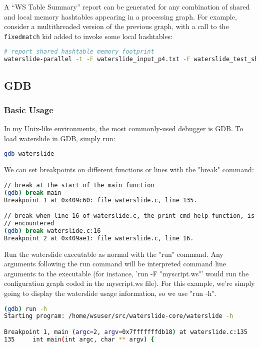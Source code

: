 \documentclass[11pt]{article}
\begin{document}
A ``WS Table Summary'' report can be generated for any combination of shared and local memory
hashtables  appearing in a processing graph. For example, consider a multithreaded version of the
previous graph, with a call to the \texttt{fixedmatch} kid added to invoke some local hashtables:

\begin{lstlisting}[language=bash]
# report shared hashtable memory footprint
waterslide-parallel -t -F waterslide_input_p4.txt -F waterslide_test_shared_p4.txt
\end{lstlisting}

\subsection{GDB}

\subsubsection{Basic Usage}
In my Unix-like environments, the most commonly-used debugger is GDB. To load
waterslide in GDB, simply run: 

\begin{lstlisting}[language=bash]
gdb waterslide
\end{lstlisting}

We can set breakpoints on different functions or lines with the "break"
command: 

\begin{lstlisting}[language=bash]
// break at the start of the main function
(gdb) break main
Breakpoint 1 at 0x409c60: file waterslide.c, line 135.

// break when line 16 of waterslide.c, the print_cmd_help function, is 
// encountered
(gdb) break waterslide.c:16
Breakpoint 2 at 0x409ae1: file waterslide.c, line 16.
\end{lstlisting}

Run the waterslide executable as normal with the "run" command. Any arguments
following the run command will be interpreted command line arguments to the 
executable (for instance, 'run -F "myscript.ws"' would run the configuration graph coded in the
myscript.ws file).  For this example, we're simply going to display the waterslide usage information, so we use "run -h".

\begin{lstlisting}[language=bash]
(gdb) run -h
Starting program: /home/wsuser/src/waterslide-core/waterslide -h

Breakpoint 1, main (argc=2, argv=0x7fffffffdb18) at waterslide.c:135
135     int main(int argc, char ** argv) {
\end{lstlisting}
\end{document}

